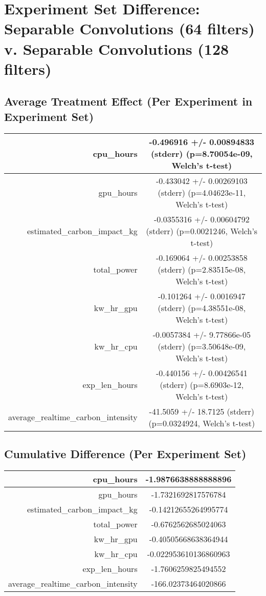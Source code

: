 \documentclass{article}%
\begin{document}
%
\normalsize%
\section{Experiment Set Difference: Separable Convolutions (64 filters) v. Separable Convolutions (128 filters)}%
\label{sec:Experiment Set Difference Separable Convolutions (64 filters) v. Separable Convolutions (128 filters)}%
\subsection{Average Treatment Effect (Per Experiment in Experiment Set)}%
\label{subsec:Average Treatment Effect (Per Experiment in Experiment Set)}%
\begin{tabular}{|r|c|}%
\hline%
cpu\_hours&{-}0.496916 +/{-} 0.00894833 (stderr) (p=8.70054e{-}09, Welch's t{-}test)\\%
\hline%
gpu\_hours&{-}0.433042 +/{-} 0.00269103 (stderr) (p=4.04623e{-}11, Welch's t{-}test)\\%
\hline%
estimated\_carbon\_impact\_kg&{-}0.0355316 +/{-} 0.00604792 (stderr) (p=0.0021246, Welch's t{-}test)\\%
\hline%
total\_power&{-}0.169064 +/{-} 0.00253858 (stderr) (p=2.83515e{-}08, Welch's t{-}test)\\%
\hline%
kw\_hr\_gpu&{-}0.101264 +/{-} 0.0016947 (stderr) (p=4.38551e{-}08, Welch's t{-}test)\\%
\hline%
kw\_hr\_cpu&{-}0.0057384 +/{-} 9.77866e{-}05 (stderr) (p=3.50648e{-}09, Welch's t{-}test)\\%
\hline%
exp\_len\_hours&{-}0.440156 +/{-} 0.00426541 (stderr) (p=8.6903e{-}12, Welch's t{-}test)\\%
\hline%
average\_realtime\_carbon\_intensity&{-}41.5059 +/{-} 18.7125 (stderr) (p=0.0324924, Welch's t{-}test)\\%
\hline%
\end{tabular}

%
\subsection{Cumulative Difference (Per Experiment Set)}%
\label{subsec:Cumulative Difference (Per Experiment Set)}%
\begin{tabular}{|r|c|}%
\hline%
cpu\_hours&{-}1.9876638888888896\\%
\hline%
gpu\_hours&{-}1.7321692817576784\\%
\hline%
estimated\_carbon\_impact\_kg&{-}0.14212655264995774\\%
\hline%
total\_power&{-}0.6762562685024063\\%
\hline%
kw\_hr\_gpu&{-}0.40505668638364944\\%
\hline%
kw\_hr\_cpu&{-}0.022953610136860963\\%
\hline%
exp\_len\_hours&{-}1.7606259825494552\\%
\hline%
average\_realtime\_carbon\_intensity&{-}166.02373464020866\\%
\hline%
\end{tabular}

%
\end{document}
